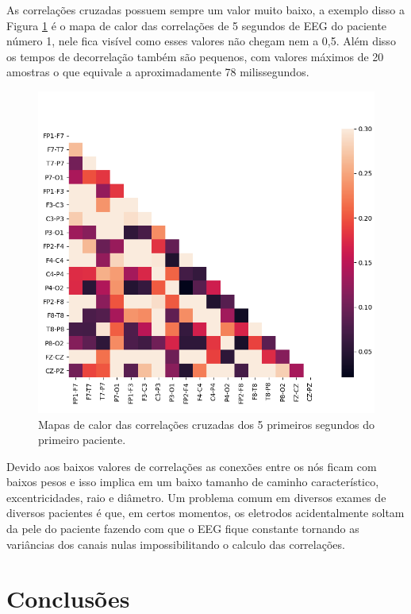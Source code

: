 \documentclass[a4paper,11pt]{article} %
\begin{document}
As correlações cruzadas possuem sempre um valor muito baixo, a exemplo disso a Figura \ref{fig:heatmap} é o mapa de calor das correlações de 5 segundos de EEG do paciente número 1, nele fica visível como esses valores não chegam nem a 0,5. Além disso os tempos de decorrelação também são pequenos, com valores máximos de 20 amostras o que equivale a aproximadamente 78 milissegundos.

\begin{figure}[ht]
	\centering
	\includegraphics[scale=.4795]{Correlações 5 primeiros segundos 1 paciente}
	\caption{Mapas de calor das correlações cruzadas dos 5 primeiros segundos do primeiro paciente.}
	\label{fig:heatmap}
\end{figure}



Devido aos baixos valores de correlações as conexões entre os nós ficam com baixos pesos e isso implica em um baixo tamanho de caminho característico, excentricidades, raio e diâmetro. Um problema comum em diversos exames de diversos pacientes é que, em certos momentos, os eletrodos acidentalmente soltam da pele do paciente fazendo com que o EEG fique constante tornando as variâncias dos canais nulas impossibilitando o calculo das correlações.

\section*{Conclusões}
\end{document}
